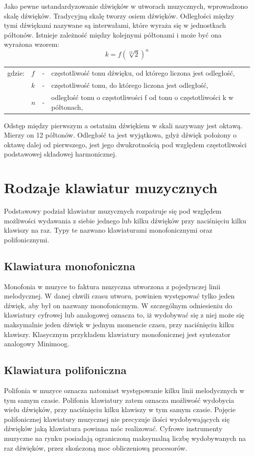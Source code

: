Jako pewne ustandardyzowanie dźwięków w utworach muzycznych, wprowadzono skalę dźwięków. Tradycyjną skalę tworzy osiem dźwięków. Odległości między tymi dźwiękami nazywane są interwałami, które wyraża się w jednostkach półtonów. Istnieje zależność między kolejnymi półtonami i może być ona wyrażona wzorem:
\begin{equation} \label{equ:idft}
k = f(\sqrt[12]{2})^{n}
\end{equation}
\begin{tabular}{ l l l l}
	gdzie: 	&	$f$ & - &  częstotliwość tonu dźwięku, od którego liczona jest odległość, \\
	&	$k$ & - &  częstotliwość tonu, do którego liczona jest odległość, \\
	&   $n$ &  - & odległość tonu o częstotliwości f od tonu o częstotliwości k w półtonach, \\
\end{tabular}

Odstęp między pierwszym a ostatnim dźwiękiem w skali nazywany jest oktawą. Mierzy on 12 półtonów. Odległość ta jest wyjątkowa, gdyż dźwięk położony o oktawę dalej od pierwszego, jest jego dwukrotnością pod względem częstotliwości podstawowej składowej harmonicznej.



\section{Rodzaje klawiatur muzycznych}
Podstawowy podział klawiatur muzycznych rozpatruje się pod względem możliwości wydawania z siebie jednego lub kilku dźwięków przy naciśnięciu kilku klawiszy na raz. Typy te nazwano klawiaturami monofonicznymi oraz polifonicznymi.

\subsection{Klawiatura monofoniczna}
Monofonia w muzyce to faktura muzyczna utworzona z pojedynczej linii melodycznej. W danej chwili czasu utworu, powinien występować tylko jeden dźwięk, aby był on nazwany monofonicznym. W szczególnym odniesieniu do klawiatury cyfrowej lub analogowej oznacza to, iż wydobywać się z niej może się maksymalnie jeden dźwięk w jednym momencie czasu, przy naciśnięciu kilku klawiszy. Klasycznym przykładem klawiatury monofonicznej jest syntezator analogowy Minimoog.

\subsection{Klawiatura polifoniczna}
Polifonia w muzyce oznacza natomiast występowanie kilku linii melodycznych w tym samym czasie. Polifonia klawiatury zatem oznacza możliwość wydobycia wielu dźwięków, przy naciśnięciu kilku klawiszy w tym samym czasie. Pojęcie polifonicznej klawiatury muzycznej nie precyzuje ilości wydobywających się dźwięków jaką klawiatura powinna móc realizować. Cyfrowe instrumenty muzyczne na rynku posiadają ograniczoną maksymalną liczbę wydobywanych na raz dźwięków, przez skończoną moc obliczeniową procesorów.

